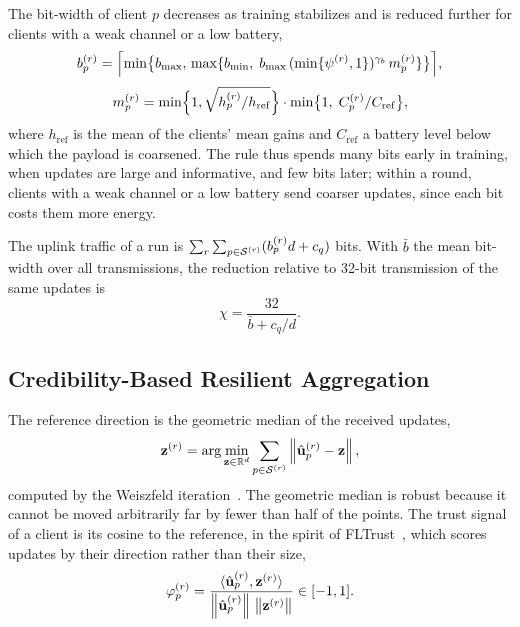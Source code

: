 The bit-width of client $p$ decreases as training stabilizes and is reduced further for clients with a weak channel or a low battery,
\begin{equation}
	b_p^{(r)}=\Bigl\lceil\min\bigl\{b_{\max},\,\max\{b_{\min},\;b_{\max}\,(\min\{\psi^{(r)},1\})^{\gamma_b}\,m_p^{(r)}\}\bigr\}\Bigr\rceil,
	\label{eq:bitwidth}
\end{equation}
\begin{equation}
	m_p^{(r)}=\min\Bigl\{1,\sqrt{h_p^{(r)}/h_{\mathrm{ref}}}\Bigr\}\cdot\min\bigl\{1,\;C_p^{(r)}/C_{\mathrm{ref}}\bigr\},
	\label{eq:mod}
\end{equation}
where $h_{\mathrm{ref}}$ is the mean of the clients' mean gains and $C_{\mathrm{ref}}$ a battery level below which the payload is coarsened. The rule thus spends many bits early in training, when updates are large and informative, and few bits later; within a round, clients with a weak channel or a low battery send coarser updates, since each bit costs them more energy.

The uplink traffic of a run is $\sum_{r}\sum_{p\in\mathcal{S}^{(r)}}(b_p^{(r)}d+c_q)$ bits. With $\bar b$ the mean bit-width over all transmissions, the reduction relative to 32-bit transmission of the same updates is
\begin{equation}
	\chi=\frac{32}{\bar b+c_q/d} .
	\label{eq:compression}
\end{equation}

\subsection{Credibility-Based Resilient Aggregation}
\label{subsec:credibility}

The reference direction is the geometric median of the received updates,
\begin{equation}
	\mathbf{z}^{(r)}=\arg\min_{\mathbf{z}\in\mathbb{R}^d}\sum_{p\in\mathcal{S}^{(r)}}\left\lVert \hat{\mathbf{u}}_p^{(r)}-\mathbf{z} \right\rVert,
	\label{eq:gm}
\end{equation}
computed by the Weiszfeld iteration~\cite{pillutla2022robust}. The geometric median is robust because it cannot be moved arbitrarily far by fewer than half of the points. The trust signal of a client is its cosine to the reference, in the spirit of FLTrust~\cite{cao2021fltrust}, which scores updates by their direction rather than their size,
\begin{equation}
	\varphi_p^{(r)}=\frac{\langle\hat{\mathbf{u}}_p^{(r)},\mathbf{z}^{(r)}\rangle}{\left\lVert \hat{\mathbf{u}}_p^{(r)} \right\rVert\,\left\lVert \mathbf{z}^{(r)} \right\rVert}\in[-1,1].
	\label{eq:cos}
\end{equation}

